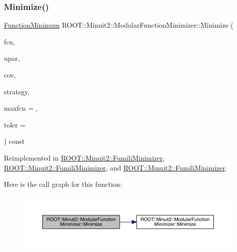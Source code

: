 \subsubsection{\texorpdfstring{Minimize()}{Minimize()}\hspace{0.1cm}{\footnotesize\ttfamily [21/33]}}
{\footnotesize\ttfamily \mbox{\hyperlink{classROOT_1_1Minuit2_1_1FunctionMinimum}{Function\+Minimum}} R\+O\+O\+T\+::\+Minuit2\+::\+Modular\+Function\+Minimizer\+::\+Minimize (\begin{DoxyParamCaption}\item[{const \mbox{\hyperlink{classROOT_1_1Minuit2_1_1FCNBase}{F\+C\+N\+Base}} \&}]{fcn,  }\item[{const \mbox{\hyperlink{classROOT_1_1Minuit2_1_1MnUserParameters}{Mn\+User\+Parameters}} \&}]{upar,  }\item[{const \mbox{\hyperlink{classROOT_1_1Minuit2_1_1MnUserCovariance}{Mn\+User\+Covariance}} \&}]{cov,  }\item[{const \mbox{\hyperlink{classROOT_1_1Minuit2_1_1MnStrategy}{Mn\+Strategy}} \&}]{strategy,  }\item[{unsigned int}]{maxfcn = {},  }\item[{double}]{toler = {} }\end{DoxyParamCaption}) const\hspace{0.3cm}{\ttfamily [virtual]}}



Reimplemented in \mbox{\hyperlink{classROOT_1_1Minuit2_1_1FumiliMinimizer_a954728eb57315bb43039fe2ba71f4098}{R\+O\+O\+T\+::\+Minuit2\+::\+Fumili\+Minimizer}}, \mbox{\hyperlink{classROOT_1_1Minuit2_1_1FumiliMinimizer_a954728eb57315bb43039fe2ba71f4098}{R\+O\+O\+T\+::\+Minuit2\+::\+Fumili\+Minimizer}}, and \mbox{\hyperlink{classROOT_1_1Minuit2_1_1FumiliMinimizer_a954728eb57315bb43039fe2ba71f4098}{R\+O\+O\+T\+::\+Minuit2\+::\+Fumili\+Minimizer}}.

Here is the call graph for this function\+:
\nopagebreak
\begin{figure}[H]
\begin{center}
\leavevmode
\includegraphics[width=350pt]{d3/dc8/classROOT_1_1Minuit2_1_1ModularFunctionMinimizer_a8db208c6cdcef4c527781732ee613436_cgraph}
\end{center}
\end{figure}
\mbox{\label{classROOT_1_1Minuit2_1_1ModularFunctionMinimizer_a79a1879062ddd4959716be08c519954e}} 

